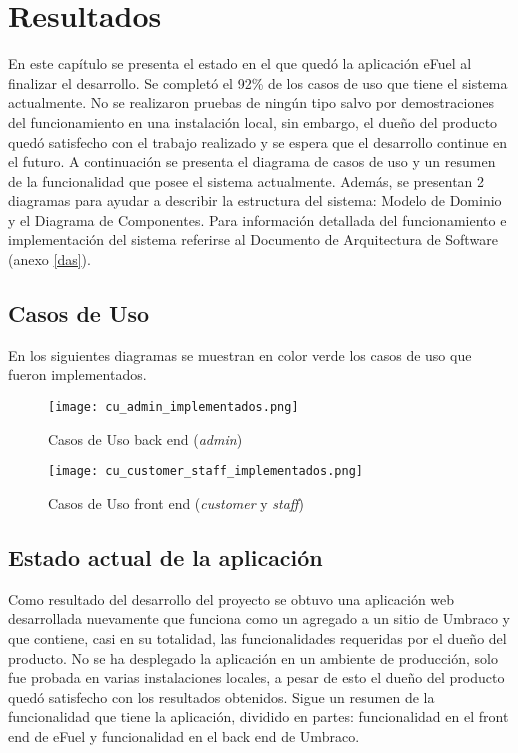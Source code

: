 \chapter{Resultados} \label{results}
En este capítulo se presenta el estado en el que quedó la aplicación eFuel al finalizar el desarrollo. Se completó el 92\% de los casos de uso que tiene el sistema actualmente. No se realizaron pruebas de ningún tipo salvo por demostraciones del funcionamiento en una instalación local, sin embargo, el dueño del producto quedó satisfecho con el trabajo realizado y se espera que el desarrollo continue en el futuro. A continuación se presenta el diagrama de casos de uso y un resumen de la funcionalidad que posee el sistema actualmente. Además, se presentan 2 diagramas para ayudar a describir la estructura del sistema: Modelo de Dominio y el Diagrama de Componentes. Para información detallada del funcionamiento e implementación del sistema referirse al Documento de Arquitectura de Software (anexo \ref{das}).

\section{Casos de Uso} \label{useCases}
En los siguientes diagramas se muestran en color verde los casos de uso que fueron implementados.

\begin{figure}[H]
    \texttt{[image: cu\_admin\_implementados.png]}
    \caption{Casos de Uso back end (\emph{admin})}
    \label{fig:cu_admin_implementados}
    \centering
\end{figure}

\begin{figure}[H]
    \texttt{[image: cu\_customer\_staff\_implementados.png]}
    \caption{Casos de Uso front end (\emph{customer} y \emph{staff})}
    \label{fig:cu_customer_staff_implementados}
    \centering
\end{figure}

\section{Estado actual de la aplicación}
Como resultado del desarrollo del proyecto se obtuvo una aplicación web desarrollada nuevamente que funciona como un agregado a un sitio de Umbraco y que contiene, casi en su totalidad, las funcionalidades requeridas por el dueño del producto. No se ha desplegado la aplicación en un ambiente de producción, solo fue probada en varias instalaciones locales, a pesar de esto el dueño del producto quedó satisfecho con los resultados obtenidos. Sigue un resumen de la funcionalidad que tiene la aplicación, dividido en partes: funcionalidad en el front end de eFuel y funcionalidad en el back end de Umbraco.

